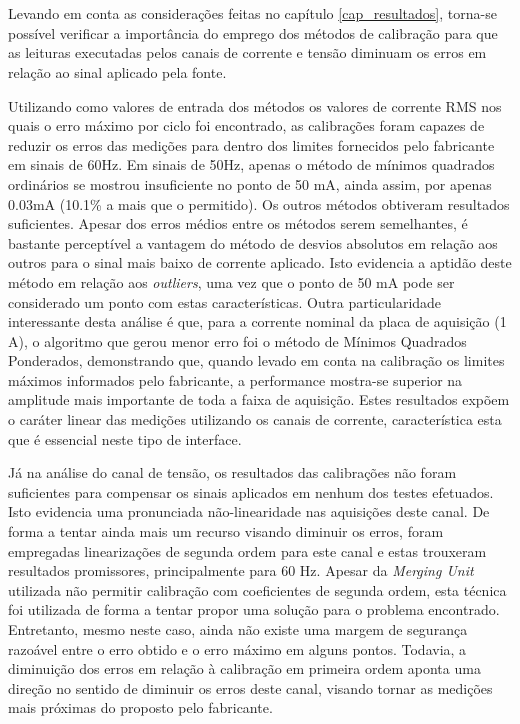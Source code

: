 

\chapter{}

   Levando em conta as considerações feitas no capítulo \ref{cap_resultados}, torna-se possível verificar a importância do emprego dos métodos de calibração para que as leituras executadas pelos canais de corrente e tensão diminuam os erros em relação ao sinal aplicado pela fonte. 
   
   Utilizando como valores de entrada dos métodos os valores de corrente RMS nos quais o erro máximo por ciclo foi encontrado, as calibrações foram capazes de reduzir os erros das medições para dentro dos limites fornecidos pelo fabricante em sinais de 60Hz. Em sinais de 50Hz, apenas o método  de mínimos quadrados ordinários se mostrou insuficiente no ponto de 50 mA, ainda assim, por apenas 0.03mA (10.1\% a mais que o permitido). Os outros métodos obtiveram resultados suficientes. Apesar dos erros médios entre os métodos serem semelhantes, é bastante perceptível a vantagem do método de desvios absolutos em relação aos outros para o sinal mais baixo de corrente aplicado. Isto evidencia a aptidão deste método em relação aos \textit{outliers}, uma vez que o ponto de 50 mA pode ser considerado um ponto com estas características. Outra particularidade interessante desta análise é que, para a corrente nominal da placa de aquisição (1 A), o algoritmo que gerou menor erro foi o método de Mínimos Quadrados Ponderados, demonstrando que, quando levado em conta na calibração os limites máximos informados pelo fabricante, a performance mostra-se superior na amplitude mais importante de toda a faixa de aquisição. Estes resultados expõem o caráter linear das medições utilizando os canais de corrente, característica esta que é essencial neste tipo de interface.
   
   Já na análise do canal de tensão, os resultados das calibrações não foram suficientes para compensar os sinais aplicados em nenhum dos testes efetuados. Isto evidencia uma pronunciada não-linearidade nas aquisições deste canal. De forma a tentar ainda mais um recurso visando diminuir os erros, foram empregadas linearizações de segunda ordem para este canal e estas trouxeram resultados promissores, principalmente para 60 Hz. Apesar da \textit{Merging Unit} utilizada não permitir calibração com coeficientes de segunda ordem, esta técnica foi utilizada de forma a tentar propor uma solução para o problema encontrado. Entretanto, mesmo neste caso, ainda não existe uma margem de segurança razoável entre o erro obtido e o erro máximo em alguns pontos. Todavia, a diminuição dos erros em relação à calibração em primeira ordem aponta uma direção no sentido de diminuir os erros deste canal, visando tornar as medições mais próximas do proposto pelo fabricante. 
  
